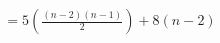 \documentclass[preview]{standalone}
\begin{document}
\begin{align*}
= 5 \left(\frac{(n-2)(n-1)}{2}\right) + 8(n-2)
\end{align*}
\end{document}
